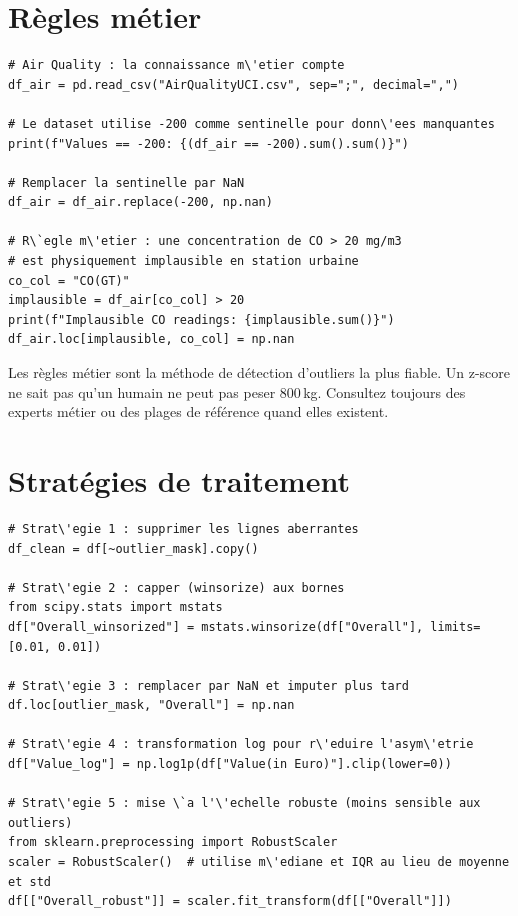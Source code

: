 \section{R\`egles m\'etier}

\begin{verbatim}
# Air Quality : la connaissance m\'etier compte
df_air = pd.read_csv("AirQualityUCI.csv", sep=";", decimal=",")

# Le dataset utilise -200 comme sentinelle pour donn\'ees manquantes
print(f"Values == -200: {(df_air == -200).sum().sum()}")

# Remplacer la sentinelle par NaN
df_air = df_air.replace(-200, np.nan)

# R\`egle m\'etier : une concentration de CO > 20 mg/m3
# est physiquement implausible en station urbaine
co_col = "CO(GT)"
implausible = df_air[co_col] > 20
print(f"Implausible CO readings: {implausible.sum()}")
df_air.loc[implausible, co_col] = np.nan
\end{verbatim}

\begin{datatip}
Les r\`egles m\'etier sont la m\'ethode de d\'etection d'outliers la plus fiable. Un z-score ne sait pas qu'un humain ne peut pas peser 800\,kg. Consultez toujours des experts m\'etier ou des plages de r\'ef\'erence quand elles existent.
\end{datatip}

\section{Strat\'egies de traitement}

\begin{verbatim}
# Strat\'egie 1 : supprimer les lignes aberrantes
df_clean = df[~outlier_mask].copy()

# Strat\'egie 2 : capper (winsorize) aux bornes
from scipy.stats import mstats
df["Overall_winsorized"] = mstats.winsorize(df["Overall"], limits=[0.01, 0.01])

# Strat\'egie 3 : remplacer par NaN et imputer plus tard
df.loc[outlier_mask, "Overall"] = np.nan

# Strat\'egie 4 : transformation log pour r\'eduire l'asym\'etrie
df["Value_log"] = np.log1p(df["Value(in Euro)"].clip(lower=0))

# Strat\'egie 5 : mise \`a l'\'echelle robuste (moins sensible aux outliers)
from sklearn.preprocessing import RobustScaler
scaler = RobustScaler()  # utilise m\'ediane et IQR au lieu de moyenne et std
df[["Overall_robust"]] = scaler.fit_transform(df[["Overall"]])
\end{verbatim}

